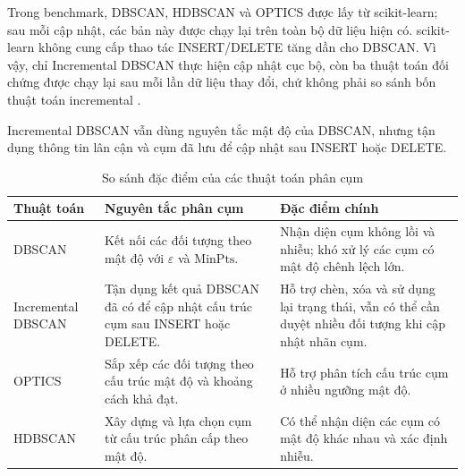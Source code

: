 Trong benchmark, DBSCAN, HDBSCAN và OPTICS được lấy từ scikit-learn; sau mỗi cập nhật, các bản này được chạy lại trên toàn bộ dữ liệu hiện có. scikit-learn không cung cấp thao tác INSERT/DELETE tăng dần cho DBSCAN. Vì vậy, chỉ Incremental DBSCAN thực hiện cập nhật cục bộ, còn ba thuật toán đối chứng được chạy lại sau mỗi lần dữ liệu thay đổi, chứ không phải so sánh bốn thuật toán incremental \parencite{sklearnDBSCAN,sklearnHDBSCAN,sklearnOPTICS}.

Incremental DBSCAN vẫn dùng nguyên tắc mật độ của DBSCAN, nhưng tận dụng thông tin lân cận và cụm đã lưu để cập nhật sau INSERT hoặc DELETE.

\begin{table}[H]
\centering
\caption{So sánh đặc điểm của các thuật toán phân cụm}
\label{tab:clustering_algorithm_comparison}
\normalsize
\begin{tabularx}{\textwidth}{|P{2.6cm}|Y|Y|}\hline
\textbf{Thuật toán} &
\textbf{Nguyên tắc phân cụm} &
\textbf{Đặc điểm chính} \\\hline
DBSCAN &
Kết nối các đối tượng theo mật độ với \(\varepsilon\) và \(\mathrm{MinPts}\). &
Nhận diện cụm không lồi và nhiễu; khó xử lý các cụm có mật độ chênh lệch lớn. \\\hline

Incremental DBSCAN &
Tận dụng kết quả DBSCAN đã có để cập nhật cấu trúc cụm sau INSERT hoặc DELETE. &
Hỗ trợ chèn, xóa và sử dụng lại trạng thái, vẫn có thể cần duyệt nhiều đối tượng khi cập nhật nhãn cụm. \\\hline

OPTICS &
Sắp xếp các đối tượng theo cấu trúc mật độ và khoảng cách khả đạt. &
Hỗ trợ phân tích cấu trúc cụm ở nhiều ngưỡng mật độ. \\\hline

HDBSCAN &
Xây dựng và lựa chọn cụm từ cấu trúc phân cấp theo mật độ. &
Có thể nhận diện các cụm có mật độ khác nhau và xác định nhiễu. \\\hline
\end{tabularx}
\end{table}
